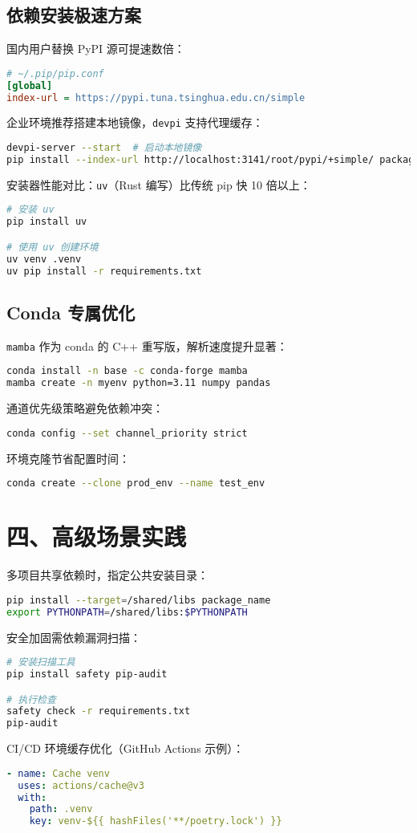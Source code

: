 \section{依赖安装极速方案}
国内用户替换 PyPI 源可提速数倍：\par
\begin{lstlisting}[language=ini]
# ~/.pip/pip.conf
[global]
index-url = https://pypi.tuna.tsinghua.edu.cn/simple
\end{lstlisting}
企业环境推荐搭建本地镜像，\verb!devpi! 支持代理缓存：\par
\begin{lstlisting}[language=bash]
devpi-server --start  # 启动本地镜像
pip install --index-url http://localhost:3141/root/pypi/+simple/ package
\end{lstlisting}
安装器性能对比：\verb!uv!（Rust 编写）比传统 pip 快 10 倍以上：\par
\begin{lstlisting}[language=bash]
# 安装 uv
pip install uv

# 使用 uv 创建环境
uv venv .venv  
uv pip install -r requirements.txt
\end{lstlisting}
\section{Conda 专属优化}
\verb!mamba! 作为 conda 的 C++ 重写版，解析速度提升显著：\par
\begin{lstlisting}[language=bash]
conda install -n base -c conda-forge mamba
mamba create -n myenv python=3.11 numpy pandas
\end{lstlisting}
通道优先级策略避免依赖冲突：\par
\begin{lstlisting}[language=bash]
conda config --set channel_priority strict
\end{lstlisting}
环境克隆节省配置时间：\par
\begin{lstlisting}[language=bash]
conda create --clone prod_env --name test_env
\end{lstlisting}
\chapter{四、高级场景实践}
多项目共享依赖时，指定公共安装目录：\par
\begin{lstlisting}[language=bash]
pip install --target=/shared/libs package_name
export PYTHONPATH=/shared/libs:$PYTHONPATH
\end{lstlisting}
安全加固需依赖漏洞扫描：\par
\begin{lstlisting}[language=bash]
# 安装扫描工具
pip install safety pip-audit

# 执行检查
safety check -r requirements.txt
pip-audit
\end{lstlisting}
CI/CD 环境缓存优化（GitHub Actions 示例）：\par
\begin{lstlisting}[language=yaml]
- name: Cache venv
  uses: actions/cache@v3
  with:
    path: .venv
    key: venv-${{ hashFiles('**/poetry.lock') }}
\end{lstlisting}
